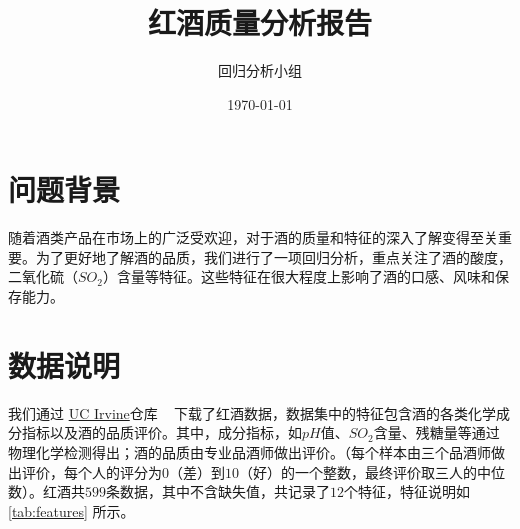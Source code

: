 \documentclass[fontset=ubuntu]{ctexart}
\title{红酒质量分析报告}
\author{回归分析小组}
\date{\today}
\begin{document}
    \maketitle
    \thispagestyle{empty}
    \newpage

    \tableofcontents
    \thispagestyle{empty}
    \newpage
    \setcounter{page}{1} %

    \section{问题背景}
        随着酒类产品在市场上的广泛受欢迎，对于酒的质量和特征的深入了解变得至关重要。为了更好地了解酒的品质，我们进行了一项回归分析，重点关注了酒的酸度，二氧化硫（$SO_2$）含量等特征。这些特征在很大程度上影响了酒的口感、风味和保存能力。 

    \section{数据说明}
        我们通过 \href{https://archive.ics.uci.edu/dataset/186/wine+quality}{UC Irvine}仓库 ~\cite{cortez2009modeling} 下载了红酒数据，数据集中的特征包含酒的各类化学成分指标以及酒的品质评价。其中，成分指标，如$pH$值、$SO_2$含量、残糖量等通过物理化学检测得出；酒的品质由专业品酒师做出评价。（每个样本由三个品酒师做出评价，每个人的评分为$0$（差）到$10$（好）的一个整数，最终评价取三人的中位数）。红酒共$599$条数据，其中不含缺失值，共记录了$12$个特征，特征说明如 \ref{tab:features} 所示。
\end{document}

